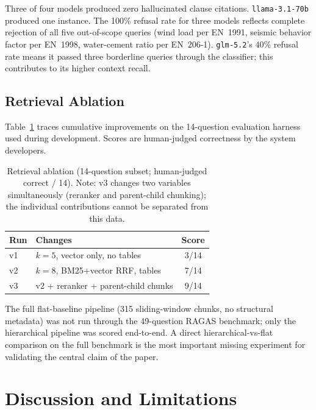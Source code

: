 \documentclass[conference]{IEEEtran}
\begin{document}
\noindent
Three of four models produced zero hallucinated clause citations.
\texttt{llama-3.1-70b} produced one instance.
The 100\% refusal rate for three models reflects complete rejection of
all five out-of-scope queries (wind load per EN~1991, seismic behavior
factor per EN~1998, water-cement ratio per EN~206-1).
\texttt{glm-5.2}'s 40\% refusal rate means it passed three borderline
queries through the classifier; this contributes to its higher context
recall.

\subsection{Retrieval Ablation}

Table~\ref{tab:ablation} traces cumulative improvements on the
14-question evaluation harness used during development.
Scores are human-judged correctness by the system developers.

\begin{table}[htbp]
  \centering
  \caption{Retrieval ablation (14-question subset; human-judged
    correct / 14). Note: v3 changes two variables simultaneously
    (reranker and parent-child chunking); the individual contributions
    cannot be separated from this data.}
  \label{tab:ablation}
  \begin{tabular}{@{}lp{4.6cm}c@{}}
    \toprule
    Run & Changes & Score \\
    \midrule
    v1 & $k{=}5$, vector only, no tables    & 3/14 \\
    v2 & $k{=}8$, BM25+vector RRF, tables   & 7/14 \\
    v3 & v2 + reranker + parent-child chunks & 9/14 \\
    \bottomrule
  \end{tabular}
\end{table}

\noindent
The full flat-baseline pipeline (315 sliding-window chunks, no
structural metadata) was not run through the 49-question RAGAS
benchmark; only the hierarchical pipeline was scored end-to-end.
A direct hierarchical-vs-flat comparison on the full benchmark is the
most important missing experiment for validating the central claim of
the paper.

\section{Discussion and Limitations}
\label{sec:discussion}
\end{document}
